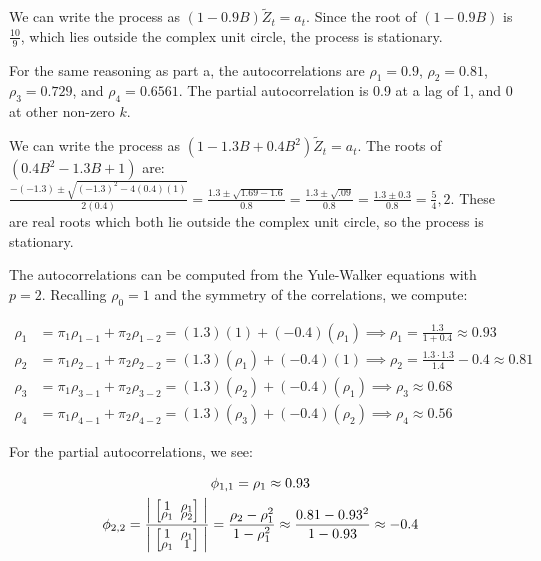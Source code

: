 \documentclass[12pt, letterpaper]{article}
\newcommand{\mymatrix}[1]{
	\renewcommand{\arraystretch}{0.5} %
	\setlength\arraycolsep{3pt}       %
	\scalebox{0.90}{                  %
		$\begin{bmatrix}
			#1
		\end{bmatrix}$
	}                   
	\renewcommand{\arraystretch}{1.0} %
	\setlength\arraycolsep{6pt}       %
}
\theoremstyle{definition}
\numberwithin{equation}{section}
\newcommand{\+}[1]{+_{\scalebox{.375}{#1}}}
\newcommand{\1}{\mathbbm{1}}
\begin{document}
We can write the process as $(1-0.9B)\tilde{Z}_t=a_t$. Since the root of $(1-0.9B)$ is $\frac{10}{9}$, which lies outside the complex unit circle, the process is stationary.
\vspace{\baselineskip}

For the same reasoning as part a, the autocorrelations are $\rho_1=0.9$, $\rho_2=0.81$, $\rho_3=0.729$, and $\rho_4=0.6561$. The partial autocorrelation is 0.9 at a lag of 1, and 0 at other non-zero $k$.

\vspace{\baselineskip}
\noindent\textbf{}
\vspace{\baselineskip}

We can write the process as $(1-1.3B+0.4B^2)\tilde{Z}_t=a_t$. The roots of $(0.4B^2-1.3B+1)$ are: $\frac{-(-1.3) \pm \sqrt{(-1.3)^2-4(0.4)(1)}}{2(0.4)}=\frac{1.3 \pm \sqrt{1.69-1.6}}{0.8}=\frac{1.3 \pm \sqrt{.09}}{0.8}=\frac{1.3 \pm 0.3}{0.8}=\frac{5}{4}, 2$. These are real roots which both lie outside the complex unit circle, so the process is stationary.
\vspace{\baselineskip}

The autocorrelations can be computed from the Yule-Walker equations with $p=2$. Recalling $\rho_0=1$ and the symmetry of the correlations, we compute:

\vspace{-0.5cm}
\begin{align*}
	\rho_1&=\pi_1\rho_{1-1}+\pi_2\rho_{1-2}=(1.3)(1)+(-0.4)(\rho_1) \implies \rho_1=\frac{1.3}{1+0.4}\approx 0.93\\
	\rho_2&=\pi_1\rho_{2-1}+\pi_2\rho_{2-2}=(1.3)(\rho_1)+(-0.4)(1) \implies \rho_2=\frac{1.3\cdot1.3}{1.4}-0.4\approx 0.81\\
	\rho_3&=\pi_1\rho_{3-1}+\pi_2\rho_{3-2}=(1.3)(\rho_2)+(-0.4)(\rho_1) \implies \rho_3\approx 0.68\\
	\rho_4&=\pi_1\rho_{4-1}+\pi_2\rho_{4-2}=(1.3)(\rho_3)+(-0.4)(\rho_2) \implies \rho_4\approx 0.56
\end{align*} 


\vspace{\baselineskip}

For the partial autocorrelations, we see:

\begin{gather*}
	\phi_{1,1}=\rho_1\approx0.93\\
	\phi_{2,2}=\frac{\left|\mymatrix{1 & \rho_1\\ \rho_1 & \rho_2}\right|}{\left|\mymatrix{1 & \rho_1\\ \rho_1 & 1}\right|}=\frac{\rho_2-\rho_1^2}{1-\rho_1^2}\approx \frac{0.81-0.93^2}{1-0.93}\approx -0.4
\end{gather*} 
\end{document}

